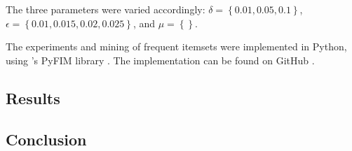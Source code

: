 \documentclass[../main.tex]{subfiles}
\begin{document}
The three parameters were varied accordingly:
$\delta = \left\{ 0.01, 0.05, 0.1 \right\}$,\\
$\epsilon = \left\{ 0.01, 0.015, 0.02, 0.025 \right\}$, and
$\mu = \left\{ \right\}$.

The experiments and mining of frequent itemsets were implemented in Python,
using \citeauthor{Borgelt2016}'s PyFIM library \cite{Borgelt2016}.
The implementation can be found on GitHub \cite{Robeer2017}.

\subsection{Results}
\label{sec:II_results}

\subsection{Conclusion}
\label{sec:II_conclusion}
\end{document}
